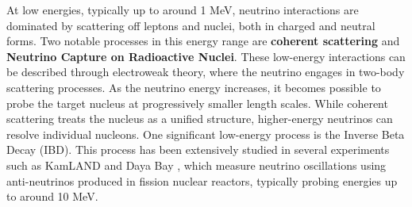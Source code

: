 At low energies, typically up to around 1 MeV, neutrino interactions are dominated by scattering off leptons and nuclei, both in charged and neutral forms. Two notable processes in this energy range are \textbf{coherent scattering} and \textbf{Neutrino Capture on Radioactive Nuclei}. These low-energy interactions can be described through electroweak theory, where the neutrino engages in two-body scattering processes. As the neutrino energy increases, it becomes possible to probe the target nucleus at progressively smaller length scales. While coherent scattering treats the nucleus as a unified structure, higher-energy neutrinos can resolve individual nucleons. One significant low-energy process is the Inverse Beta Decay (IBD). This process has been extensively studied in several experiments such as KamLAND  and Daya Bay , which measure neutrino oscillations using  anti-neutrinos produced in fission nuclear reactors, typically probing energies up to around 10 MeV.

